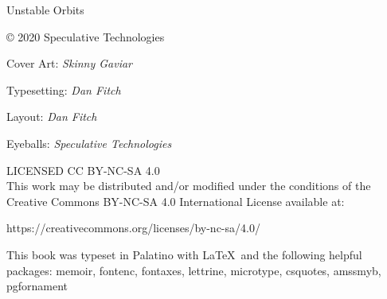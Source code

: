 \pagestyle{empty}

\mainmatter
\raggedbottom

{
\null\vfill

\begin{flushleft}

{\small

{\variexfont{}Unstable Orbits}

\copyright{} 2020 {\tubefont{}Speculative Technologies}

\bigskip

Cover Art: \emph{Skinny Gaviar}

Typesetting: \emph{Dan Fitch}

Layout: \emph{Dan Fitch}

Eyeballs: \emph{Speculative Technologies}

\bigskip

LICENSED CC BY-NC-SA 4.0 \\
This work may be distributed and/or modified under the conditions of the Creative Commons BY-NC-SA 4.0 International License available at:
\begin{monotype}
https://creativecommons.org/licenses/by-nc-sa/4.0/
\end{monotype}

This book was typeset in Palatino with \LaTeX\ and the following helpful packages:
  memoir,
  fontenc,
  fontaxes,
  lettrine,
  microtype,
  csquotes,
  amssmyb,
  pgfornament
\bigskip
}
\end{flushleft}
}

\clearpage


